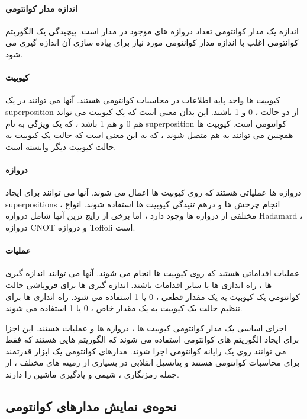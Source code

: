 \documentclass{book}
\begin{document}
\paragraph{اندازه مدار کوانتومی}

اندازه یک مدار کوانتومی تعداد دروازه های موجود در مدار است. پیچیدگی یک الگوریتم کوانتومی اغلب با اندازه مدار کوانتومی مورد نیاز برای پیاده سازی آن اندازه گیری می شود.


\paragraph{کیوبیت}

کیوبیت ها واحد پایه اطلاعات در محاسبات کوانتومی هستند. آنها می توانند در یک superposition از دو حالت ، 0 و 1 باشند. این بدان معنی است که یک کیوبیت می تواند هم 0 و هم 1 باشد ، که یک ویژگی به نام superposition کوانتومی است. کیوبیت ها همچنین می توانند به هم متصل شوند ، که به این معنی است که حالت یک کیوبیت به حالت کیوبیت دیگر وابسته است.
\paragraph{دروازه}
دروازه ها عملیاتی هستند که روی کیوبیت ها اعمال می شوند. آنها می توانند برای ایجاد superpositions ، انجام چرخش ها و درهم تنیدگی کیوبیت ها استفاده شوند. انواع مختلفی از دروازه ها وجود دارد ، اما برخی از رایج ترین آنها شامل دروازه Hadamard ، دروازه CNOT و دروازه Toffoli است.

\paragraph{عملیات}

عملیات اقداماتی هستند که روی کیوبیت ها انجام می شوند. آنها می توانند اندازه گیری ها ، راه اندازی ها یا سایر اقدامات باشند. اندازه گیری ها برای فروپاشی حالت کوانتومی یک کیوبیت به یک مقدار قطعی ، 0 یا 1 استفاده می شود. راه اندازی ها برای تنظیم حالت یک کیوبیت به یک مقدار خاص ، 0 یا 1 استفاده می شوند.




اجزای اساسی یک مدار کوانتومی کیوبیت ها ، دروازه ها و عملیات هستند. این اجزا برای ایجاد الگوریتم های کوانتومی استفاده می شوند که الگوریتم هایی هستند که فقط می توانند روی یک رایانه کوانتومی اجرا شوند. مدارهای کوانتومی یک ابزار قدرتمند برای محاسبات کوانتومی هستند و پتانسیل انقلابی در بسیاری از زمینه های مختلف ، از جمله رمزنگاری ، شیمی و یادگیری ماشین را دارند.

\subsection{نحوه‌ی نمایش مدار‌های کوانتومی}
\end{document}
